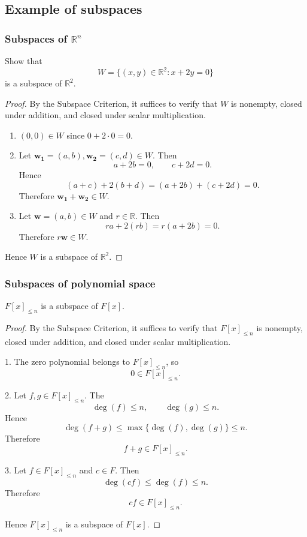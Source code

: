 \documentclass[12pt]{article}
\begin{document}
\subsection{Example of subspaces}
\subsubsection{Subspaces of $\mathbb{R}^n$}

Show that
\[
W = \{(x,y)\in\mathbb{R}^2:x+2y=0\}
\]
is a subspace of $\mathbb{R}^2$.

\begin{proof}
By the Subspace Criterion, it suffices to verify that $W$ is nonempty,
closed under addition, and closed under scalar multiplication.

\begin{enumerate}
\item $(0,0)\in W$ since $0 + 2\cdot 0 = 0$.

\bigskip

\item Let $\mathbf{w_1} = (a,b), \mathbf{w_2} = (c,d)\in W$. Then
\[
a + 2b = 0,\qquad c + 2d = 0. 
\]
Hence
\[
(a + c) + 2(b + d) = (a + 2b)+(c + 2d) = 0.
\]
Therefore $\mathbf{w_1} + \mathbf{w_2}\in W$.

\bigskip

\item Let $\mathbf{w} = (a,b)\in W$ and $r\in\mathbb R$. Then
\[
ra + 2(rb) = r(a + 2b) = 0.
\]
Therefore $r\mathbf{w}\in W$.

\bigskip

\end{enumerate}

Hence $W$ is a subspace of $\mathbb R^2$.
\end{proof}

\subsubsection{Subspaces of polynomial space}

$F[x]_{\le n}$ is a subspace of $F[x]$.

\begin{proof}
By the Subspace Criterion, it suffices to verify that
$F[x]_{\le n}$ is nonempty, closed under addition, and closed under scalar multiplication.

\bigskip

1. The zero polynomial belongs to $F[x]_{\le n}$, so
\[
0\in F[x]_{\le n}.
\]

\bigskip

2. Let $f,g\in F[x]_{\le n}$. The
\[
\deg(f)\le n, \qquad \deg(g)\le n.
\]
Hence
\[
\deg(f+g)\le \max\{\deg(f),\deg(g)\}\le n.
\]
Therefore
\[
f+g\in F[x]_{\le n}.
\]

\bigskip

3. Let $f\in F[x]_{\le n}$ and $c\in F$. Then
\[
\deg(cf)\le \deg(f)\le n.
\]
Therefore
\[
cf\in F[x]_{\le n}.
\]

\bigskip

Hence $F[x]_{\le n}$ is a subspace of $F[x]$.

\end{proof}
\end{document}
